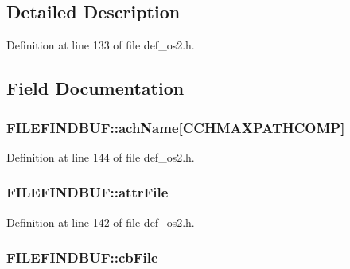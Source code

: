 \subsection{Detailed Description}


Definition at line 133 of file def\+\_\+os2.\+h.



\subsection{Field Documentation}
\hypertarget{structFILEFINDBUF_af221d8680985f28c71f5caf0ca6f5ad0}{
\subsubsection[{ach\+Name}]{ F\+I\+L\+E\+F\+I\+N\+D\+B\+U\+F\+::ach\+Name\mbox{[}{\bf C\+C\+H\+M\+A\+X\+P\+A\+T\+H\+C\+O\+M\+P}\mbox{]}}}\label{structFILEFINDBUF_af221d8680985f28c71f5caf0ca6f5ad0}


Definition at line 144 of file def\+\_\+os2.\+h.

\hypertarget{structFILEFINDBUF_a8a8dfb575701fd3240525d7d21cd46c9}{
\subsubsection[{attr\+File}]{ F\+I\+L\+E\+F\+I\+N\+D\+B\+U\+F\+::attr\+File}}\label{structFILEFINDBUF_a8a8dfb575701fd3240525d7d21cd46c9}


Definition at line 142 of file def\+\_\+os2.\+h.

\hypertarget{structFILEFINDBUF_a991798d9c57bed83fe5b4706ccfe8802}{
\subsubsection[{cb\+File}]{ F\+I\+L\+E\+F\+I\+N\+D\+B\+U\+F\+::cb\+File}}\label{structFILEFINDBUF_a991798d9c57bed83fe5b4706ccfe8802}


